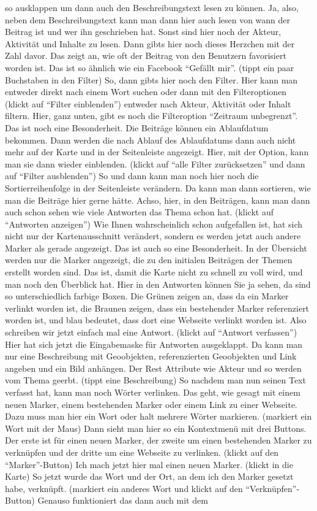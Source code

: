 \begin{itemize}
so ausklappen um dann auch den Beschreibungstext lesen zu k{\"o}nnen. Ja, also, neben dem Beschreibungstext kann man dann hier auch lesen von wann der Beitrag ist und wer ihn geschrieben hat. Sonst sind hier noch der Akteur, Aktivit{\"a}t und Inhalte zu lesen. Dann gibts hier noch dieses Herzchen mit der Zahl davor. Das zeigt an, wie oft der Beitrag von den Benutzern favorisiert worden ist. Das ist so {\"a}hnlich wie ein Facebook "`Gef{\"a}llt mir"'. (tippt ein paar Buchstaben in den Filter) So, dann gibts hier noch den Filter. Hier kann man entweder direkt nach einem Wort suchen oder dann mit den Filteroptionen (klickt auf "`Filter einblenden"') entweder nach Akteur, Aktivit{\"a}t oder Inhalt filtern. Hier, ganz unten, gibt es noch die Filteroption "`Zeitraum unbegrenzt"'. Das ist noch eine Besonderheit. Die Beitr{\"a}ge k{\"o}nnen ein Ablaufdatum bekommen. Dann werden die nach Ablauf des Ablaufdatums dann auch nicht mehr auf der Karte und in der Seitenleiste angezeigt. Hier, mit der Option, kann man sie dann wieder einblenden. (klickt auf "`alle Filter zur{\"u}cksetzen"' und dann auf "`Filter ausblenden"') So und dann kann man noch hier noch die Sortierreihenfolge in der Seitenleiste ver{\"a}ndern. Da kann man dann sortieren, wie man die Beitr{\"a}ge hier gerne h{\"a}tte. Achso, hier, in den Beitr{\"a}gen, kann man dann auch schon sehen wie viele Antworten das Thema schon hat. (klickt auf "`Antworten anzeigen"') Wie Ihnen wahrscheinlich schon aufgefallen ist, hat sich nicht nur der Kartenausschnitt ver{\"a}ndert, sondern es werden jetzt auch andere Marker als gerade angezeigt. Das ist auch so eine Besonderheit. In der {\"U}bersicht werden nur die Marker angezeigt, die zu den initialen Beitr{\"a}gen der Themen erstellt worden sind. Das ist, damit die Karte nicht zu schnell zu voll wird, und man noch den {\"U}berblick hat. Hier in den Antworten k{\"o}nnen Sie ja sehen, da sind so unterschiedlich farbige Boxen. Die Gr{\"u}nen zeigen an, dass da ein Marker verlinkt worden ist, die Braunen zeigen, dass ein bestehender Marker referenziert worden ist, und blau bedeutet, dass dort eine Webseite verlinkt worden ist. Also schreiben wir jetzt einfach mal eine Antwort. (klickt auf "`Antwort verfassen"') Hier hat sich jetzt die Eingabemaske f{\"u}r Antworten ausgeklappt. Da kann man nur eine Beschreibung mit Geoobjekten, referenzierten Geoobjekten und Link angeben und ein Bild anh{\"a}ngen. Der Rest Attribute wie Akteur und so werden vom Thema geerbt. (tippt eine Beschreibung) So nachdem man nun seinen Text verfasst hat, kann man noch W{\"o}rter verlinken. Das geht, wie gesagt mit einem neuen Marker, einem bestehenden Marker oder einem Link zu einer Webseite. Dazu muss man hier ein Wort oder halt mehrere W{\"o}rter markieren. (markiert ein Wort mit der Maus) Dann sieht man hier so ein Kontextmen{\"u} mit drei Buttons. Der erste ist f{\"u}r einen neuen Marker, der zweite um einen bestehenden Marker zu verkn{\"u}pfen und der dritte um eine Webseite zu verlinken. (klickt auf den "`Marker"'-Button) Ich mach jetzt hier mal einen neuen Marker. (klickt in die Karte) So jetzt wurde das Wort und der Ort, an dem ich den Marker gesetzt habe, verkn{\"u}pft. (markiert ein anderes Wort und klickt auf den "`Verkn{\"u}pfen"'-Button) Genauso funktioniert das dann auch mit dem 
\end{itemize}
